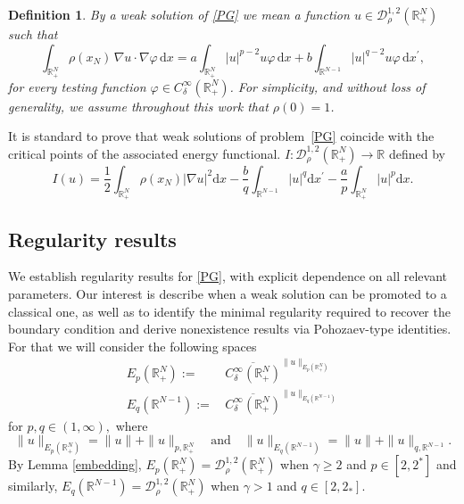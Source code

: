 \documentclass[12pt,reqno]{amsart}
\newtheorem{definition}[theorem]{Definition}
\begin{document}
\begin{definition} By a weak solution of \eqref{PG} we mean a function  
$ u \in \mathcal{D}^{1,2}_\rho(\mathds{R}^N_+)$
such that  
\begin{equation}\label{weak solution}
   \int_{\mathds{R}^{N}_+} \rho(x_N)\,\nabla u \cdot \nabla \varphi \, \mathrm{d}x
   = a \int_{\mathds{R}^{N}_+} |u|^{p-2}u \varphi \, \mathrm{d}x  
   + b \int_{\mathds{R}^{N-1}} |u|^{q-2}u \varphi \, \mathrm{d}x^\prime,
\end{equation}
for every testing function $\varphi \in C_\delta^\infty(\mathds{R}^N_+)$.  
For simplicity, and without loss of generality, we assume throughout this work that $\rho(0)=1$.

\end{definition}



It is standard to prove that weak solutions of problem~\eqref{PG} 
coincide with the critical points of the associated energy functional.
$I:\mathcal{D}^{1,2}_\rho(\mathds{R}^N_+) \to \mathds{R}$ defined by
\begin{equation*}
I(u)=\frac{1}{2}\int_{\mathds{R}^N_+}\rho(x_N)|\nabla u|^2\mathrm{d}x-\frac{b}{q}\int_{\mathds{R}^{N-1}}|u|^q\mathrm{d}x^\prime-\frac{a}{p}\int_{\mathds{R}^N_+}|u|^p\mathrm{d}x.
\end{equation*}

\subsection{Regularity results} We establish regularity results for \eqref{PG}, with explicit dependence on all relevant parameters. Our interest is describe when a weak solution can be promoted to a classical one, as well as to identify the minimal regularity required to recover the boundary condition and derive nonexistence results via Pohozaev-type identities. For that we will consider the following spaces 
\begin{equation}
    \begin{aligned}
        E_p(\mathds{R}^N_+) :=\, & \overline{C^\infty_\delta(\mathds{R}^N_+)}^{\|u\|_{E_p(\mathds{R}^N_+)}}\\ 
        E_q(\mathds{R}^{N-1}) :=\, & \overline{C^\infty_\delta(\mathds{R}^N_+)}^{\|u\|_{E_q(\mathds{R}^{N-1})}}
    \end{aligned}
\end{equation}
for $p,q\in(1,\infty),$ where 
\begin{equation*}   
\|u\|_{E_p(\mathds{R}^N_+)}=\|u\|+\|u\|_{p,\mathds{R}^N_+}\quad\text{and}\quad  \|u\|_{E_q(\mathds{R}^{N-1})}=\|u\|+\|u\|_{q,\mathds{R}^{N-1}}.
\end{equation*}
 By Lemma \ref{embedding}, $E_p(\mathds{R}^N_+)=\mathcal{D}^{1,2}_\rho(\mathds{R}^N_+)$ when $\gamma\geq2$ and $p\in[2,2^\ast]$ and similarly, $E_q(\mathds{R}^{N-1})=\mathcal{D}^{1,2}_\rho(\mathds{R}^N_+)$ when $\gamma>1$ and $q\in[2,2_\ast]$.
\end{document}
